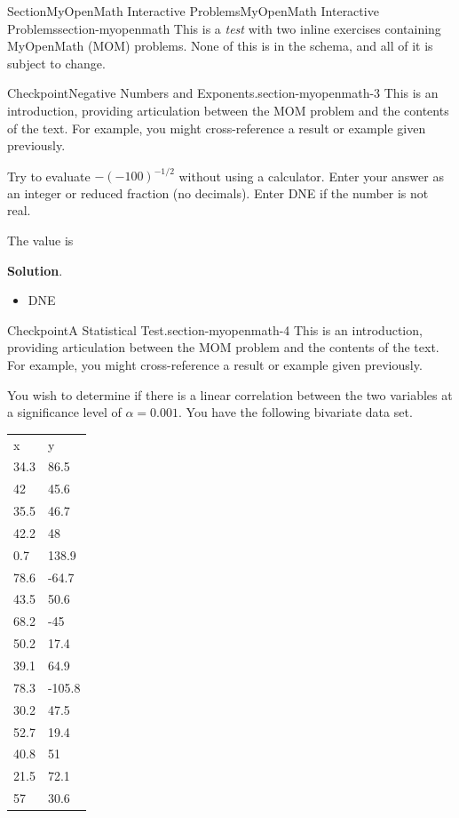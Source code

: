 \documentclass[twoside,10pt,]{article}
\newcommand{\blocktitlefont}{\relax}
\newcommand{\tabularfont}{\relax}
\numberwithin{equation}{section}
\begin{document}
\typeout{************************************************}
%
\begin{sectionptx}{Section}{MyOpenMath Interactive Problems}{}{MyOpenMath Interactive Problems}{}{}{section-myopenmath}
This is a \emph{test} with two inline exercises containing MyOpenMath (MOM) problems.  None of this is in the schema, and all of it is subject to change.%
\begin{inlineexercise}{Checkpoint}{Negative Numbers and Exponents.}{section-myopenmath-3}%
This is an introduction, providing articulation between the MOM problem and the contents of the text.  For example, you might cross-reference a result or example given previously.%
\par
Try to evaluate \(\displaystyle-{\left(-{100}\right)}^{{-{1}{/}{2}}}\) without using a calculator. Enter your answer as an integer or reduced fraction (no decimals). Enter DNE if the number is not real.%
\par
The value is   %
\par\smallskip%
\noindent\textbf{\blocktitlefont Solution}.\hypertarget{section-myopenmath-3-3}{}\quad{}%
\begin{itemize}[label=\textbullet]
\item{}DNE%
\end{itemize}
%
\end{inlineexercise}%
\begin{inlineexercise}{Checkpoint}{A Statistical Test.}{section-myopenmath-4}%
This is an introduction, providing articulation between the MOM problem and the contents of the text.  For example, you might cross-reference a result or example given previously.%
\par
You wish to determine if there is a  linear correlation between the two variables at a significance level of \(\displaystyle\alpha={0.001}\). You have the following bivariate data set.%
\begin{center}%
{\tabularfont%
\begin{tabular}{ll}
x&y\tabularnewline[0pt]
34.3&86.5\tabularnewline[0pt]
42&45.6\tabularnewline[0pt]
35.5&46.7\tabularnewline[0pt]
42.2&48\tabularnewline[0pt]
0.7&138.9\tabularnewline[0pt]
78.6&-64.7\tabularnewline[0pt]
43.5&50.6\tabularnewline[0pt]
68.2&-45\tabularnewline[0pt]
50.2&17.4\tabularnewline[0pt]
39.1&64.9\tabularnewline[0pt]
78.3&-105.8\tabularnewline[0pt]
30.2&47.5\tabularnewline[0pt]
52.7&19.4\tabularnewline[0pt]
40.8&51\tabularnewline[0pt]
21.5&72.1\tabularnewline[0pt]
57&30.6\tabularnewline[0pt]

\end{tabular}}
\end{center}
\end{inlineexercise}
\end{sectionptx}
\end{document}

